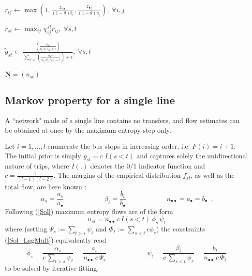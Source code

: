 \documentclass{bmcart}
\begin{document}
\begin{algorithm}[H]
\begin{algorithmic}[1]
		\State $r_{ij} \leftarrow \max \left(1, \frac{z_{i \bullet}}{(1 - \theta)b_i}, \frac{z_{\bullet j}}{(1 - \theta)a_j} \right), \; \forall i,j$
		
		\State $\bar{r}_{st} \leftarrow \max_{ij} \chi_{ij}^{st} r_{ij}, \; \forall s,t$
		
		\State $\widetilde{g}_{st} \leftarrow \frac{\left( \frac{n_{st}}{\phi_s \psi_t \bar{r}_{st} + \epsilon} \right)}{\sum_{s',t'} \left( \frac{n_{s't'}}{\phi_{s'} \psi_{t'}\bar{r}_{s't'} + \epsilon} \right) + \epsilon}, \; \forall s,t$ 
		
		\EndWhile
		\State \Return $\mathbf{N} = (n_{st})$
	\end{algorithmic}
\end{algorithm}


\subsection{Markov property for a single line}
\label{Single line}
A ``network" made of a single line contains no transfers, and flow estimates can be obtained at once by the maximum entropy step only.


Let  $i=1,\ldots, l$ enumerate the bus stops in increasing order,  i.e. $F(i)=i+1$. The initial prior is simply $g_{st}=c\; I(s<t)$ and captures solely the unidirectional nature of trips,  where $I(.)$ denotes the 0/1  indicator function and $c=\frac{1}{(l-1)(l-2)}$.   The margins of the empirical distribution $f_{st}$, as well as the total flow, are here known : 
\begin{displaymath}
\alpha_s=\frac{a_s}{a_\bullet}\qquad\qquad\qquad \beta_t=\frac{b_t}{b_\bullet}\qquad\qquad\qquad n_{\bullet\bullet}=a_{\bullet}=b_\bullet\enspace. 
\end{displaymath}
Following  (\ref{Sol}) maximum entropy flows are of the form
\begin{equation}
\label{nosignle}
n_{st}= n_{\bullet\bullet}\,  c\, I(s<t)\, \phi_s\,  \psi_t 
\end{equation}
where (setting $\Psi_s:=\sum_{t>s}\psi_t$ and $\Phi_t:=\sum_{s<t}c\phi_s$) the constraints (\ref{Sol_LagMult}) equivalently read
\begin{equation}
\label{dis embarking constraints}
\phi_s=\frac{\alpha_s}{c\, \sum_{t>s}\psi_t}=\frac{a_s}{n_{\bullet\bullet}\,  c\, \Psi_s}
\qquad\qquad\qquad
\psi_t=\frac{\beta_t}{c\, \sum_{s<t}\phi_s}=\frac{b_t}{n_{\bullet\bullet}\, c\, \Phi_t}
\end{equation}
to be solved by iterative fitting. 
\end{document}
